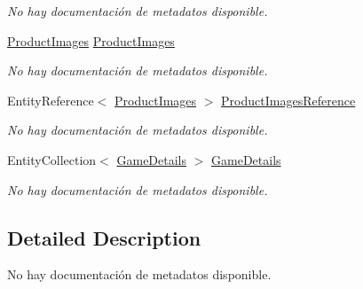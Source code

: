 \begin{DoxyCompactItemize}
\begin{DoxyCompactList}\small\item\em No hay documentación de metadatos disponible. \end{DoxyCompactList}\item 
\hyperlink{class_microsoft_1_1_samples_1_1_kinect_1_1_basic_interactions_1_1_product_images}{Product\-Images} \hyperlink{class_microsoft_1_1_samples_1_1_kinect_1_1_basic_interactions_1_1_commercial_products_a7bdf9ca1ce5c4fa4062e9528cdd5b44d}{Product\-Images}
\begin{DoxyCompactList}\small\item\em No hay documentación de metadatos disponible. \end{DoxyCompactList}\item 
Entity\-Reference$<$ \hyperlink{class_microsoft_1_1_samples_1_1_kinect_1_1_basic_interactions_1_1_product_images}{Product\-Images} $>$ \hyperlink{class_microsoft_1_1_samples_1_1_kinect_1_1_basic_interactions_1_1_commercial_products_a468696913dd0c9920b9c73dca5bd58af}{Product\-Images\-Reference}
\begin{DoxyCompactList}\small\item\em No hay documentación de metadatos disponible. \end{DoxyCompactList}\item 
Entity\-Collection$<$ \hyperlink{class_microsoft_1_1_samples_1_1_kinect_1_1_basic_interactions_1_1_game_details}{Game\-Details} $>$ \hyperlink{class_microsoft_1_1_samples_1_1_kinect_1_1_basic_interactions_1_1_commercial_products_ab3a9a76979f610137ce8709b4a4d44f7}{Game\-Details}
\begin{DoxyCompactList}\small\item\em No hay documentación de metadatos disponible. \end{DoxyCompactList}\end{DoxyCompactItemize}


\subsection{Detailed Description}
No hay documentación de metadatos disponible. 



